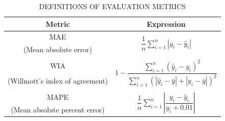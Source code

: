\documentclass[lettersize,journal]{IEEEtran}
\begin{document}
\begin{table}[!t]
  \caption{DEFINITIONS OF EVALUATION METRICS\label{tab1}}
  \centering
  \begin{tabular}{cc}
  \toprule
  Metric & Expression \\
  \midrule
  MAE & \multirow{2}{*}{$\dfrac{1}{n} \sum_{i=1}^{n} \left| y_i - \hat{y}_i \right|$} \\
  (Mean absolute error) & \\
  \\
  WIA & \multirow{2}{*}{$1 - \dfrac{\sum_{i=1}^{n}(\hat{y}_i - y_i)^2}{\sum_{i=1}^{n}(\left|\hat{y}_i - \bar{y}\right| + \left|y_i - \bar{y}\right|)^2}$} \\
  (Willmott's index of agreement) & \\
  \\
  MAPE & \multirow{2}{*}{$\dfrac{1}{n} \sum_{i=1}^{n} \left| \dfrac{y_i - \hat{y}_i}{y_i+0.01} \right|$} \\
  (Mean absolute percent error) & \\
  \bottomrule
  \end{tabular}
\end{table}
\end{document}
